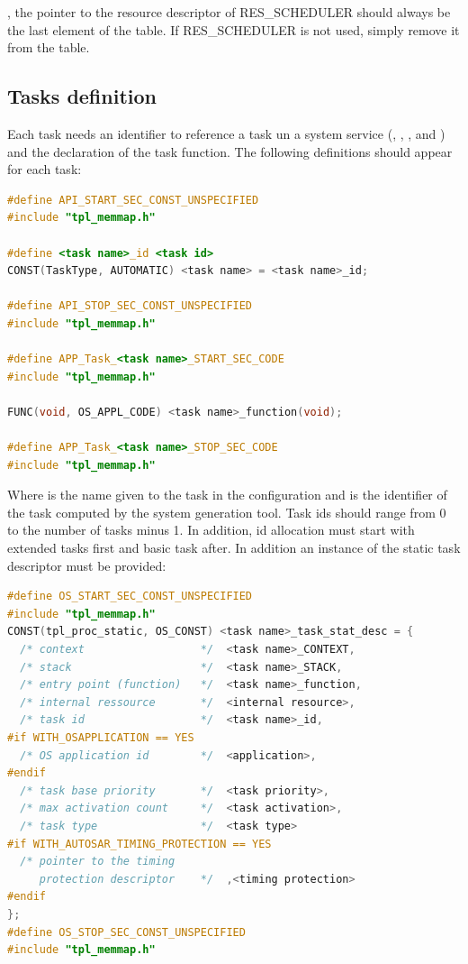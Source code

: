 , the pointer to the resource descriptor of RES_SCHEDULER should always be the last element of the table. If RES_SCHEDULER is not used, simply remove it from the table.

\subsection{Tasks definition}

Each task needs an identifier to reference a task un a system service (, , ,  and ) and the declaration of the task function. The following definitions should appear for each task:

\begin{lstlisting}[language=C]
#define API_START_SEC_CONST_UNSPECIFIED
#include "tpl_memmap.h"

#define <task name>_id <task id>
CONST(TaskType, AUTOMATIC) <task name> = <task name>_id;

#define API_STOP_SEC_CONST_UNSPECIFIED
#include "tpl_memmap.h"

#define APP_Task_<task name>_START_SEC_CODE
#include "tpl_memmap.h"

FUNC(void, OS_APPL_CODE) <task name>_function(void);

#define APP_Task_<task name>_STOP_SEC_CODE
#include "tpl_memmap.h"
\end{lstlisting}

Where  is the name given to the task in the configuration and  is the identifier of the task computed by the system generation tool. Task ids should range from 0 to the number of tasks minus 1. In addition, id allocation must start with extended tasks first and basic task after. In addition an instance of the static task descriptor must be provided:

\begin{lstlisting}[language=C]
#define OS_START_SEC_CONST_UNSPECIFIED
#include "tpl_memmap.h"
CONST(tpl_proc_static, OS_CONST) <task name>_task_stat_desc = {
  /* context                  */  <task name>_CONTEXT,
  /* stack                    */  <task name>_STACK,
  /* entry point (function)   */  <task name>_function,
  /* internal ressource       */  <internal resource>,
  /* task id                  */  <task name>_id,
#if WITH_OSAPPLICATION == YES
  /* OS application id        */  <application>,
#endif
  /* task base priority       */  <task priority>,
  /* max activation count     */  <task activation>,
  /* task type                */  <task type>
#if WITH_AUTOSAR_TIMING_PROTECTION == YES
  /* pointer to the timing
     protection descriptor    */  ,<timing protection>
#endif
};
#define OS_STOP_SEC_CONST_UNSPECIFIED
#include "tpl_memmap.h"
\end{lstlisting}

